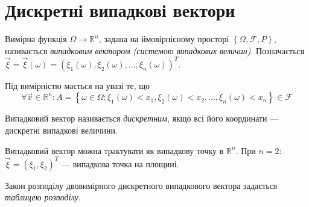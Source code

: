\section{Дискретні випадкові вектори}
\begin{definition}
    Вимірна функція $\Omega \rightarrow \mathbb{R}^n$, задана на ймовірнісному 
    просторі $\left\{\Omega, \mathcal{F}, P \right\}$, 
    називається \emph{випадковим вектором (системою випадкових величин)}.
    Позначається
$\vec{\xi} = \vec{\xi}(\omega) = 
\left(\xi_1(\omega), \xi_2(\omega), ... , \xi_n(\omega)\right)^{T}$.
\end{definition}

\begin{remark}
    Під вимірністю мається на увазі те, що 
    \begin{equation*}
        \forall \vec{x} \in \mathbb{R}^n: 
        A=\left\{\omega \in \Omega: \xi_1(\omega) < x_1, 
                                    \xi_2(\omega) < x_2,
                                    ... ,
                                    \xi_n(\omega) < x_n\right\}
        \in \mathcal{F}
    \end{equation*}
\end{remark}

\begin{definition}
    Випадковий вектор називається \emph{дискретним}, якщо всі його координати --- 
    дискретні випадкові величини.
\end{definition}
\begin{remark}
    Випадковий вектор можна трактувати як випадкову точку в $\mathbb{R}^n$.
    При $n = 2$: $\vec{\xi} = (\xi_1, \xi_2)^T$ --- випадкова точка на площині. 
\end{remark}

Закон розподілу двовимірного дискретного випадкового вектора задається 
\emph{таблицею розподілу}.


